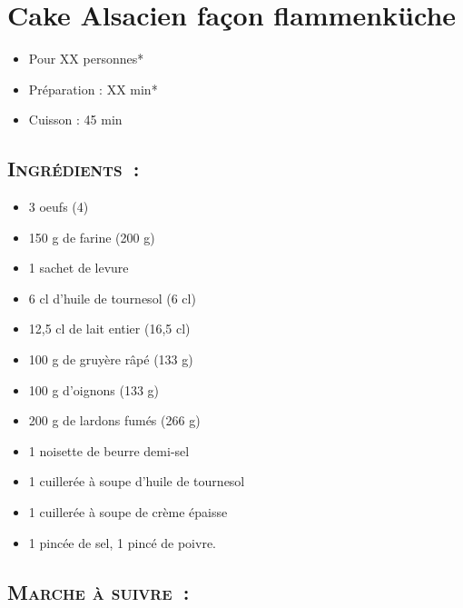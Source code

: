 \section{Cake Alsacien façon flammenküche}

\begin{itemize}
\item Pour XX personnes*		%
\item Préparation : XX min*		%
\item Cuisson : 45 min			%
\end{itemize}

\subsection*{\textsc{Ingrédients~:}}

\begin{itemize}
\item 3 oeufs (4)
\item 150 g de farine (200 g)
\item 1 sachet de levure
\item 6 cl d’huile de tournesol (6 cl)
\item 12,5 cl de lait entier (16,5 cl)
\item 100 g de gruyère râpé (133 g)
\item 100 g d’oignons (133 g)
\item 200 g de lardons fumés (266 g)
\item 1 noisette de beurre demi-sel
\item 1 cuillerée à soupe d’huile de tournesol
\item 1 cuillerée à soupe de crème épaisse
\item 1 pincée de sel, 1 pincé de poivre.
\end{itemize}


\subsection*{\textsc{Marche à suivre~:}}

